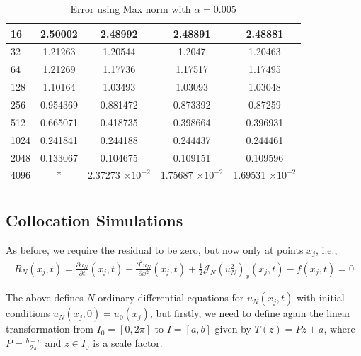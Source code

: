 \begin{table}[H]
\begin{tabular}{lcccc}
		\midrule
		\hspace{7mm} 16 & 2.50002  & 2.48992   & 2.48891   & 2.48881   \\
		\midrule
		\hspace{7mm} 32 & 1.21263  & 1.20544   & 1.2047    & 1.20463   \\
		\midrule
		\hspace{7mm} 64 & 1.21269  & 1.17736   & 1.17517   & 1.17495   \\
		\midrule
		\hspace{7mm} 128 & 1.10164  & 1.03493   & 1.03093   & 1.03048   \\
		\midrule
		\hspace{7mm} 256 & 0.954369 & 0.881472  & 0.873392  & 0.87259   \\
		\midrule
		\hspace{7mm} 512 & 0.665071 & 0.418735  & 0.398664  & 0.396931  \\
		\midrule
		\hspace{7mm} 1024 & 0.241841 & 0.244188  & 0.244437  & 0.244461  \\
		\midrule
		\hspace{7mm} 2048 & 0.133067 & 0.104675  & 0.109151  & 0.109596  \\
		\midrule
		\hspace{7mm} 4096 & * & 2.37273  $\times 10 ^{-2}$ & 1.75687  $\times 10 ^{-2}$ & 1.69531  $\times 10 ^{-2}$\\
		\\
		\bottomrule
	\end{tabular}
	\caption{Error using Max norm with $\alpha =0.005$}
	\label{Galerkin_tabla_max_alpha=005}
	\end{table}
	
	\newpage
	\subsection{Collocation Simulations}
	As before, we require the residual to be zero, but now only at points $ x_j $, i.e.,
	\begin{align*}
		R_{N} (x_j, t) = \frac{\partial u_N}{\partial t} (x_j, t) - \frac{\partial^2 u_N }{\partial x^2} (x_j, t) + \frac{1}{2} \mathcal{J}_N \left(u^2_N \right)_x (x_j, t) - f(x_j, t) = 0
	\end{align*}
	
	The above defines $N$ ordinary differential equations for $u_N (x_j , t)$ with initial conditions $u_N (x_j, 0) = u_0(x_j)$, but firstly, we need to define again the linear transformation from $I_0 = [0, 2 \pi]$ to $I = [a, b]$ given by $T (z) = P z + a$, where $P = \frac {b - a}{2 \pi}$ and $z \in I_0$ is a scale factor. \\
	
